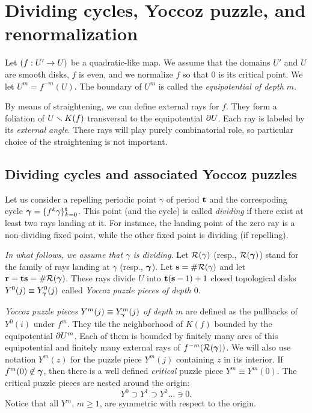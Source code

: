 \section{Dividing cycles, Yoccoz puzzle, and renormalization}\label{principal nest}

Let $(f: U'\rightarrow U)$ be a quadratic-like map.
We assume that the domains $U'$ and $U$ are smooth disks,
$f$ is even,  
and we  normalize $f$ so that $0$ is its critical point.  
We let $U^m = f^{-m}(U)$. The boundary of $U^m$ is called  
the {\it equipotential of depth $m$}.   

By means of straightening, we can define external rays for $f$. They form a foliation of $U\smallsetminus K(f)$
transversal   to the equipotential $\partial U$. Each ray is labeled by its {\it external angle}. 
These rays will play purely combinatorial role, so particular choice of the straightening
is not important. 
  
\subsection{Dividing cycles and associated Yoccoz puzzles}\label{sec: first king} 

  Let us consider a repelling periodic point $\gamma$ of period ${\mathbf{t}}$ and the correspoding cycle 
${\mbox{\boldmath$\gamma$} }=\{f^k\gamma\}_{k=0}^{\mathbf{t}}$. This point (and the cycle) is called {\it dividing}
if there exist at least two rays landing at it.  
For instance, the landing point of the zero ray is a non-dividing fixed point, 
while the other fixed point is dividing (if repelling). 

{\it In what follows, we assume that $\gamma$ is dividing.}
Let ${\mathcal R}(\gamma)$ (resp., ${\mathcal R}({\mbox{\boldmath$\gamma$} })$) stand for the family of rays landing at $\gamma$ (resp., ${\mbox{\boldmath$\gamma$} }$).
Let ${\bf s} =\# {\mathcal R}(\gamma)$ and let ${\mathbf{r}}= {\mathbf{t}}{\mathbf{s}}= \# {\mathcal R}({\mbox{\boldmath$\gamma$} })$. 
These rays divide $U$ into ${\mathbf{t}}({\mathbf{s}}-1)+1$ closed topological disks $Y^0(j)\equiv Y^0_{\mbox{\scriptsize\boldmath$\gamma$} }(j)$ called 
{\it Yoccoz puzzle pieces of depth $0$}.     


{\it Yoccoz puzzle pieces $Y^m(j)\equiv Y^m_{\mbox{\scriptsize\boldmath$\gamma$} }(j)$ of depth $m$} are  defined as the 
pullbacks of $Y^0(i)$ under $f^m$. 
They tile the neighborhood of $K(f)$ bounded by the equipotential $\partial U^m $.
Each of them is bounded by finitely many arcs of this equipotential and finitely many  
external rays of $f^{-m}({\mathcal R}({\mbox{\boldmath$\gamma$} }))$. 
We will also use notation $ Y^m(z)$ for the puzzle piece $Y^m(j)$ containing $z$ in its interior. 
If $f^m(0)\not\in {\mbox{\boldmath$\gamma$} }$, then there is a well defined {\it critical} puzzle piece  $Y^m\equiv Y^m(0)$.
The critical puzzle pieces are nested around the origin:
$$
   Y^0\supset Y^1\supset Y^2 \dots \ni 0. 
$$
Notice that all $Y^m$, $m\geq 1$, are symmetric with respect to the origin.  


